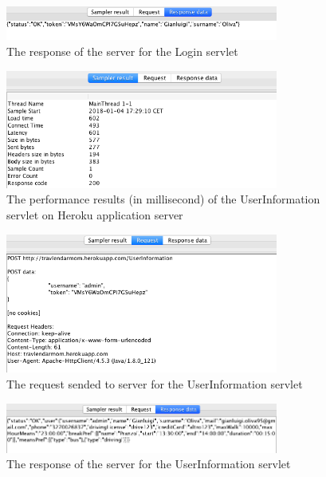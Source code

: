 \documentclass[numbers=noenddot, 12pt, a4paper, oneside]{scrbook}
\begin{document}
\begin{figure}[H]
\centering
\includegraphics[width=0.8\textwidth]{Test/LoginResp}
\caption{The response of the server for the Login servlet}
\end{figure}

\begin{figure}[H]
	\centering
	\includegraphics[width=0.8\textwidth]{Test/UserInformationMain}
	\caption{The performance results (in millisecond) of the UserInformation servlet on Heroku application server}
\end{figure}

\begin{figure}[H]
	\centering
	\includegraphics[width=0.8\textwidth]{Test/UserInformationReq}
	\caption{The request sended to server for the UserInformation servlet}
\end{figure}

\begin{figure}[H]
	\centering
	\includegraphics[width=0.8\textwidth]{Test/UserInformationResp}
	\caption{The response of the server for the UserInformation servlet}
\end{figure}
\end{document}
